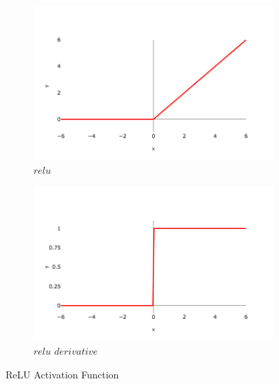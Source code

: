             \begin{figure}[H]
                \begin{subfigure}{0.5\textwidth}
                  \centering
                  \includegraphics[width=1.0\linewidth]{Images/relu.png}
                  \caption{$relu$}
                  \label{fig:reluNorm}
                \end{subfigure}%
                \begin{subfigure}{0.5\textwidth}
                  \centering
                  \includegraphics[width=1.0\linewidth]{Images/drelu.png}
                  \caption{$relu \, \, derivative$}
                  \label{fig:reluDer}
                \end{subfigure}
                \caption{ReLU Activation Function}
                \label{fig:relu}
            \end{figure}
            
